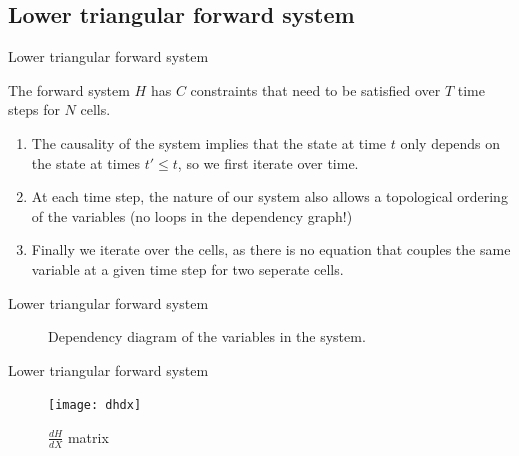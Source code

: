 \documentclass[xcolor=svgnames, english, smaller]{beamer}
\theoremstyle{plain}
\theoremstyle{definition}
\theoremstyle{plain}
\theoremstyle{plain}
\begin{document}
\subsection{Lower triangular forward system}
\begin{frame}{Lower triangular forward system}

The forward system $H$ has $C$ constraints that need to be satisfied over $T$ time steps for $N$ cells.
\newline

\begin{enumerate}
\item The causality of the system implies that the state at time $t$ only depends on the state at times $t' \leq t$, so we first iterate over time.
\item At each time step, the nature of our system also allows a topological ordering of the variables (no loops in the dependency graph!)
\item Finally we iterate over the cells, as there is no equation that couples the same variable at a given time step for two seperate cells. 
\end{enumerate}


\end{frame}

\begin{frame}{Lower triangular forward system}

\begin{figure}[h]
\hspace{-40.2in}
\resizebox{44in}{!}{}
\caption{Dependency diagram of the variables in the system.}
\end{figure}
\end{frame}

\begin{frame}{Lower triangular forward system}

\begin{figure}[h]
\texttt{[image: dhdx]}
\caption{$\frac{dH}{dX}$ matrix}
\end{figure}

\end{frame}
\end{document}
